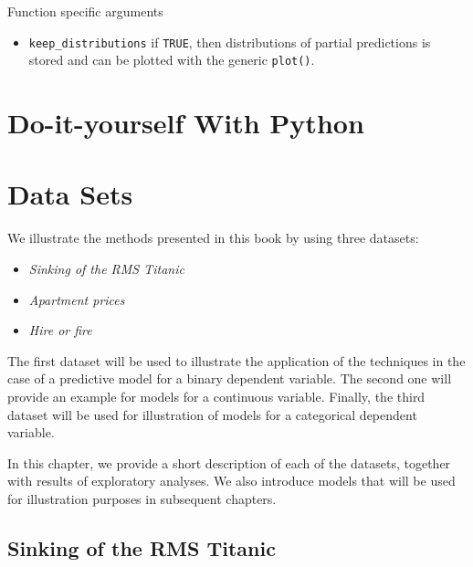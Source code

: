 \documentclass[12pt,]{krantz}
\providecommand{\tightlist}{%
  \setlength{\itemsep}{0pt}\setlength{\parskip}{0pt}}
\begin{document}
Function specific arguments

\begin{itemize}
\tightlist
\item
  \texttt{keep\_distributions} if \texttt{TRUE}, then distributions of partial predictions is stored and can be plotted with the generic \texttt{plot()}.
\end{itemize}

\hypertarget{doItYourselfWithPython}{%
\section{Do-it-yourself With Python}\label{doItYourselfWithPython}}

\hypertarget{dataSetsIntro}{%
\section{Data Sets}\label{dataSetsIntro}}

We illustrate the methods presented in this book by using three datasets:

\begin{itemize}
\tightlist
\item
  \emph{Sinking of the RMS Titanic}
\item
  \emph{Apartment prices}
\item
  \emph{Hire or fire}
\end{itemize}

The first dataset will be used to illustrate the application of the techniques in the case of a predictive model for a binary dependent variable. The second one will provide an example for models for a continuous variable. Finally, the third dataset will be used for illustration of models for a categorical dependent variable.

In this chapter, we provide a short description of each of the datasets, together with results of exploratory analyses. We also introduce models that will be used for illustration purposes in subsequent chapters.

\hypertarget{TitanicDataset}{%
\subsection{Sinking of the RMS Titanic}\label{TitanicDataset}}
\end{document}

